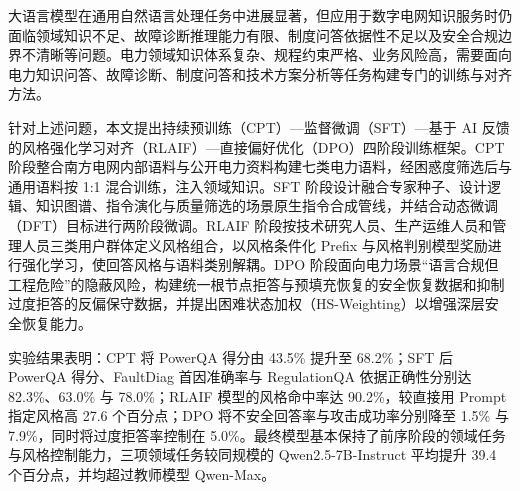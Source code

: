 \documentclass[fontset=fandol,type=master,campus=shenzhen,etitleauto=true]{hithesisbook}
\begin{document}
\frontmatter

\begin{cabstract}
大语言模型在通用自然语言处理任务中进展显著，但应用于数字电网知识服务时仍面临领域知识不足、故障诊断推理能力有限、制度问答依据性不足以及安全合规边界不清晰等问题。电力领域知识体系复杂、规程约束严格、业务风险高，需要面向电力知识问答、故障诊断、制度问答和技术方案分析等任务构建专门的训练与对齐方法。

针对上述问题，本文提出持续预训练（CPT）—监督微调（SFT）—基于 AI 反馈的风格强化学习对齐（RLAIF）—直接偏好优化（DPO）四阶段训练框架。CPT 阶段整合南方电网内部语料与公开电力资料构建七类电力语料，经困惑度筛选后与通用语料按 1:1 混合训练，注入领域知识。SFT 阶段设计融合专家种子、设计逻辑、知识图谱、指令演化与质量筛选的场景原生指令合成管线，并结合动态微调（DFT）目标进行两阶段微调。RLAIF 阶段按技术研究人员、生产运维人员和管理人员三类用户群体定义风格组合，以风格条件化 Prefix 与风格判别模型奖励进行强化学习，使回答风格与语料类别解耦。DPO 阶段面向电力场景“语言合规但工程危险”的隐蔽风险，构建统一根节点拒答与预填充恢复的安全恢复数据和抑制过度拒答的反偏保守数据，并提出困难状态加权（HS-Weighting）以增强深层安全恢复能力。

实验结果表明：CPT 将 PowerQA 得分由 43.5\% 提升至 68.2\%；SFT 后 PowerQA 得分、FaultDiag 首因准确率与 RegulationQA 依据正确性分别达 82.3\%、63.0\% 与 78.0\%；RLAIF 模型的风格命中率达 90.2\%，较直接用 Prompt 指定风格高 27.6 个百分点；DPO 将不安全回答率与攻击成功率分别降至 1.5\% 与 7.9\%，同时将过度拒答率控制在 5.0\%。最终模型基本保持了前序阶段的领域任务与风格控制能力，三项领域任务较同规模的 Qwen2.5-7B-Instruct 平均提升 39.4 个百分点，并均超过教师模型 Qwen-Max。
\end{cabstract}
\end{document}
